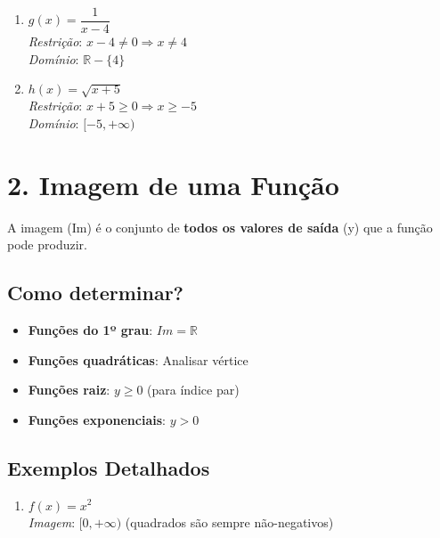 \documentclass[11pt]{article}
\begin{document}
\begin{multicols}{2}
\begin{enumerate}
    \item $g(x) = \dfrac{1}{x-4}$ \\
    \textit{Restrição}: $x-4 \neq 0 \Rightarrow x \neq 4$ \\
    \textit{Domínio}: $\mathbb{R} - \{4\}$
    
    \item $h(x) = \sqrt{x+5}$ \\
    \textit{Restrição}: $x+5 \geq 0 \Rightarrow x \geq -5$ \\
    \textit{Domínio}: $[-5, +\infty)$
\end{enumerate}

\section*{2. Imagem de uma Função}
A imagem (Im) é o conjunto de \textbf{todos os valores de saída} (y) que a função pode produzir.

\subsection*{Como determinar?}
\begin{itemize}
    \item \textbf{Funções do 1º grau}: $Im = \mathbb{R}$
    \item \textbf{Funções quadráticas}: Analisar vértice
    \item \textbf{Funções raiz}: $y \geq 0$ (para índice par)
    \item \textbf{Funções exponenciais}: $y > 0$
\end{itemize}

\begin{center}
\end{center}

\subsection*{Exemplos Detalhados}
\begin{enumerate}
    \item $f(x) = x^2$ \\
    \textit{Imagem}: $[0, +\infty)$ (quadrados são sempre não-negativos)
    

\end{enumerate}
\end{multicols}
\end{document}
